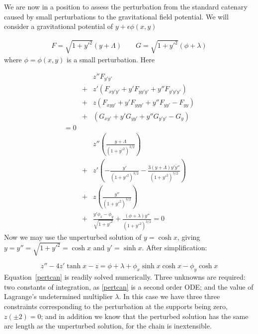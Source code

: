 \documentclass[pdflatex,sn-mathphys-num]{sn-jnl}%
\theoremstyle{thmstyleone}%
\theoremstyle{thmstyletwo}%
\theoremstyle{thmstylethree}%
\begin{document}
We are now in a position to assess the perturbation from the standard
catenary caused by small perturbations to the gravitational field
potential.  We will consider a gravitational potential of $y +
\epsilon\phi(x,y)$

\begin{eqnarray}\label{FandG}
F = \sqrt{1+y'^2}(y + \Lambda)\qquad G =  \sqrt{1+y'^2}(\phi + \lambda)
\end{eqnarray}
%
where $\phi=\phi(x,y)$ is a small perturbation.  Here 

\begin{eqnarray}
&{}& z''F_{y'y'}\nonumber\\
&+& z'(F_{xy'y'} + y'F_{yy'y'} + y''F_{y'y'y'})\nonumber\\
&+& z (F_{xyy'} + y'F_{yyy'} + y''F_{yy'}-F_{yy})\nonumber\\
&+& (G_{xy'} + y'G_{yy'} + y''G_{y'y'}- G_{y})\nonumber\\
= 0\\
&{}&  z''\left(\frac{y+\Lambda}{(1+y'^2)^{3/2}}\right)\nonumber\\
&+& z' \left(-\frac{y'}{(1+y'^2)^{3/2}} -\frac{3(y+\Lambda)y'y''}{(1+y'^2)^{5/2}}\right)\nonumber\\
&+& z  \left(\frac{y''}{(1+y'^2)^{3/2}}\right)\nonumber\\
&+& \frac{y'\phi_x-\phi_y}{\sqrt{1+y'^2}} + \frac{(\phi+\lambda)y''}{(1+y'^2)^{3/2}}=0
\end{eqnarray}
%
Now we may use the unperturbed solution of $y=\cosh x$, giving
$y=y''=\sqrt{1+y'^2}=\cosh x$ and $y'=\sinh x$.  After simplification:

\begin{equation}\label{pertcan}
  z'' - 4z'\tanh x - z =
  \phi + \lambda + \phi_x\sinh x\cosh x - \phi_y\cosh x
\end{equation}
%
Equation~\ref{pertcan} is readily solved numerically.  Three unknowns
are required: two constants of integration, as \ref{pertcan} is a
second order ODE; and the value of Lagrange's undetermined multiplier
$\lambda$.  In this case we have three three constraints corresponding
to the perturbation at the supports being zero, $z(\pm 2)=0$; and in
addition we know that the perturbed solution has the same arc length
as the unperturbed solution, for the chain is inextensible.
\end{document}
